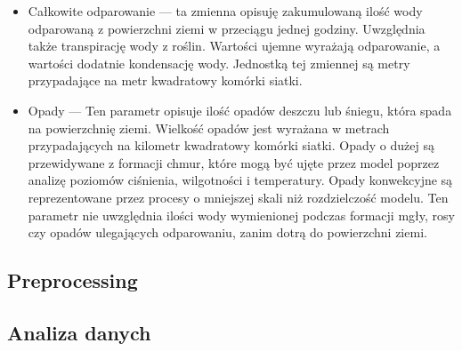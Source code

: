 \begin{itemize}
    \item Całkowite odparowanie — ta zmienna opisuję zakumulowaną ilość wody odparowaną z powierzchni
    ziemi w przeciągu jednej godziny. Uwzględnia także transpirację wody z roślin. Wartości ujemne
    wyrażają odparowanie, a wartości dodatnie kondensację wody. Jednostką tej zmiennej są metry
    przypadające na metr kwadratowy komórki siatki.

    \item Opady — Ten parametr opisuje ilość opadów deszczu lub śniegu, która spada na powierzchnię ziemi.
    Wielkość opadów jest wyrażana w metrach przypadających na kilometr kwadratowy komórki siatki.
    Opady o dużej są przewidywane z formacji chmur, które mogą być ujęte przez model poprzez 
    analizę poziomów ciśnienia, wilgotności i temperatury. 
    Opady konwekcyjne są reprezentowane przez procesy
    o mniejszej skali niż rozdzielczość modelu. Ten parametr nie uwzględnia ilości wody wymienionej
    podczas formacji mgły, rosy czy opadów ulegających odparowaniu, zanim dotrą do powierzchni ziemi.

\end{itemize}

\subsection{Preprocessing}

\subsection{Analiza danych}